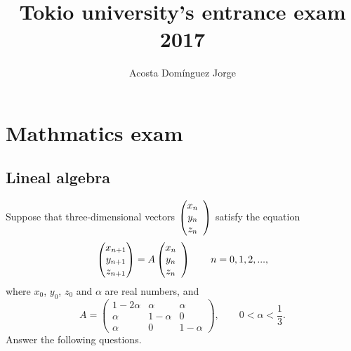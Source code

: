 \documentclass[11pt, letterpaper]{article}
\title{\textbf{Tokio university's entrance exam 2017}}
\author{Acosta Domínguez Jorge}
\date{}
\newcommand{\itab}[0]{\hspace{2em}}
\begin{document}
\maketitle
\newpage
{}

\section{Mathmatics exam}
\subsection{Lineal algebra}

Suppose that three-dimensional vectors $\left(
\begin{matrix}
x_n\\y_n\\z_n\\
\end{matrix}\\
\right)$
satisfy the equation
\begin{equation*}
\left(
\begin{matrix}
x_{n+1}\\y_{n+1}\\z_{n+1}
\end{matrix}
\right)
=A\left(
\begin{matrix}
x_n\\y_n\\z_n\\
\end{matrix}\\
\right)\itab n = 0, 1, 2, ...,
\end{equation*}
where $x_0$, $y_0$, $z_0$ and $\alpha$ are real numbers, and
\begin{equation*}
A = \left(\begin{matrix}
1-2\alpha & \alpha & \alpha\\
\alpha & 1-\alpha & 0\\
\alpha & 0 & 1-\alpha
\end{matrix}\right),\itab0<\alpha<\frac{1}{3}.
\end{equation*}
Answer the following questions.
\end{document}
